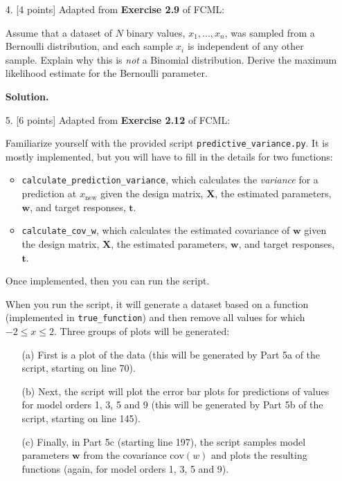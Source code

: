 \documentclass[10pt]{article}
\begin{document}
\begin{itemize}
\item[4.] [4 points]
Adapted from {\bf Exercise 2.9} of FCML:

Assume that a dataset of $N$ binary values, $x_1, ..., x_n$, was sampled from a Bernoulli distribution, and each sample $x_i$ is independent of any other sample.  Explain why this is {\em not} a Binomial distribution.  Derive the maximum likelihood estimate for the Bernoulli parameter.

{\bf Solution.} 



\item[5.] [6 points]
Adapted from {\bf Exercise 2.12} of FCML:

Familiarize yourself with the provided script {\tt predictive\_variance.py}.  
It is mostly implemented, but you will have to fill in the details for two functions: 
\begin{itemize}
\item {\tt calculate\_prediction\_variance}, which calculates the {\em variance} for a prediction at $x_{\mathrm{new}}$ given the design matrix, $\mathbf{X}$, the estimated parameters, $\mathbf{w}$, and target responses, $\mathbf{t}$.
\item {\tt calculate\_cov\_w}, which calculates the estimated covariance of $\mathbf{w}$ given the design matrix, $\mathbf{X}$, the estimated parameters, $\mathbf{w}$, and target responses, $\mathbf{t}$.
\end{itemize}
Once implemented, then you can run the script.

When you run the script, it will generate a dataset based on a function (implemented in {\tt true\_function}) and then remove all values for which $-2 \leq x \leq 2$.  Three groups of plots will be generated:
\begin{enumerate}
\item[(a)] First is a plot of the data (this will be generated by Part 5a of the script, starting on line 70).  
\item[(b)] Next, the script will plot the error bar plots for predictions of values for model orders 1, 3, 5 and 9 (this will be generated by Part 5b of the script, starting on line 145).  
\item[(c)] Finally, in Part 5c (starting line 197), the script samples model parameters $\mathbf{w}$ from the covariance $\mathrm{cov}(w)$ and plots the resulting functions (again, for model orders 1, 3, 5 and 9).
\end{enumerate}


\end{itemize}
\end{document}
